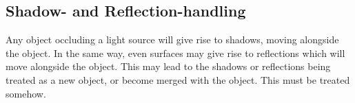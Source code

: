 \subsection{Shadow- and Reflection-handling}
Any object occluding a light source will give rise to shadows, moving alongside the object. In the same way, even surfaces may give rise to reflections which will move alongside the object. This may lead to the shadows or reflections being treated as a new object, or become merged with the object. This must be treated somehow.\\
